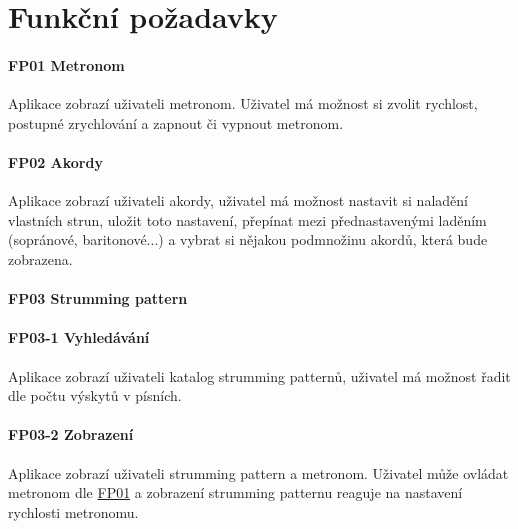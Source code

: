 \section{Funkční požadavky}
\label{sc:functional_req}

\noindent \begin{minipage}{\textwidth}
    \paragraph{FP01 Metronom} \label{FP01}
    \begin{smallindent}{}
        Aplikace zobrazí uživateli metronom. Uživatel má možnost si zvolit rychlost, postupné zrychlování a zapnout či vypnout metronom.
    \end{smallindent}
\end{minipage}

\noindent \begin{minipage}{\textwidth}
    \paragraph{FP02 Akordy} \label{FP02}
    \begin{smallindent}{}
        Aplikace zobrazí uživateli akordy, uživatel má možnost nastavit si naladění vlastních strun, uložit toto nastavení, přepínat mezi přednastavenými laděním (sopránové, baritonové...) a vybrat si nějakou podmnožinu akordů, která bude zobrazena.
    \end{smallindent}
\end{minipage}

\noindent \begin{minipage}{\textwidth}
    \paragraph{FP03 Strumming pattern}
    \noindent \paragraph{FP03-1 Vyhledávání} \label{FP03-1}
    \begin{smallindent}{}
        Aplikace zobrazí uživateli katalog strumming patternů, uživatel má možnost řadit dle počtu výskytů v písních.
    \end{smallindent}
\end{minipage}

\noindent \begin{minipage}{\textwidth}
    \paragraph{FP03-2 Zobrazení} \label{FP03-2}
    \begin{smallindent}{}
        Aplikace zobrazí uživateli strumming pattern a metronom. Uživatel může ovládat metronom dle \hyperref[FP01]{FP01} a zobrazení strumming patternu reaguje na nastavení rychlosti metronomu.
    \end{smallindent}
\end{minipage}

